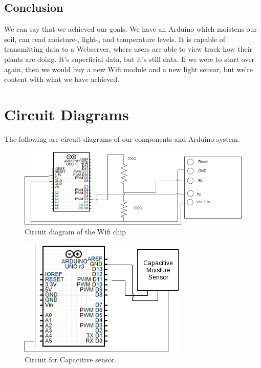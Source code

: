\documentclass[a4paper,12pt,oneside,openright,titlepage]{book}
\begin{document}
\section{Conclusion}
We can say that we achieved our goals. We have an Arduino which moistens our soil, can read moisture-, light-, and temperature levels. It is capable of transmitting data to a Webserver, where users are able to view track how their plants are doing. It's superficial data, but it's still data. If we were to start over again, then we would buy a new Wifi module and a new light sensor, but we're content with what we have achieved.

\appendix
\chapter{Circuit Diagrams}
The following are circuit diagrams of our components and Arduino system.
\begin{figure}[!ht]
  \centering
      \includegraphics[scale=0.8]{WifiCircuit}
  \caption{Circuit diagram of the Wifi chip}
  \label{fig:WifiCircuit}
\end{figure}

\begin{figure}[!ht]
  \centering
      \includegraphics[scale=0.9]{Capacitive}
  \caption{Circuit for Capacitive sensor.}
  \label{fig:CapacitiveCircuit}
\end{figure}
\end{document}
